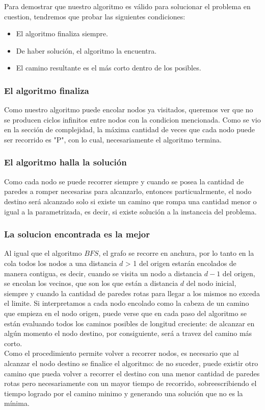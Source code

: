 Para demostrar que nuestro algoritmo es válido para solucionar el problema en cuestion, tendremos que probar las siguientes condiciones:\\

\begin{itemize}
\item El algoritmo finaliza siempre.
\item De haber solución, el algoritmo la encuentra.
\item El camino resultante es el m\'as corto dentro de los posibles.
\end{itemize}

\subsubsection*{El algoritmo finaliza }
Como nuestro algoritmo puede encolar nodos ya visitados, queremos ver que no se producen ciclos infinitos entre nodos con la condicion mencionada. Como se vio en la sección de complejidad, la máxima cantidad de veces que cada nodo puede ser recorrido es "P", con lo cual, necesariamente el algoritmo termina.

\subsubsection*{El algoritmo halla la solución}

Como cada nodo se puede recorrer siempre y cuando se posea la cantidad de paredes a romper necesarias para alcanzarlo, entonces particualrmente, el nodo destino será alcanzado solo si existe un camino que rompa una cantidad menor o igual a la parametrizada, es decir, si existe solución a la instanccia del problema. 

\subsubsection*{La solucion encontrada es la mejor}

Al igual que el algoritmo $BFS$, el grafo se recorre en anchura, por lo tanto en la cola todos los nodos a una distancia $d$ > 1 del origen estarán encolados de manera contigua, es decir, cuando se visita un nodo a distancia $d-1$ del origen, se encolan los vecinos, que son los que están a distancia $d$ del nodo inicial, siempre y cuando la cantidad de paredes rotas para llegar a los mismos no exceda el limite. Si interpretamos a cada nodo encolado como la cabeza de un camino que empieza en el nodo origen, puede verse que en cada paso del algoritmo se están evaluando todos los caminos posibles de longitud creciente: de alcanzar en algún momento el nodo destino, por consiguiente, será a travez del camino más corto.\\

Como el procedimiento permite volver a recorrer nodos, es necesario que al alcanzar el nodo destino se finalice el algoritmo: de no suceder, puede existir otro camino que pueda volver a recorrer el destino con una menor cantidad de paredes rotas pero necesariamente con un mayor tiempo de recorrido, sobreescribiendo el tiempo logrado por el camino minimo y generando una solución que no es la mínima.



